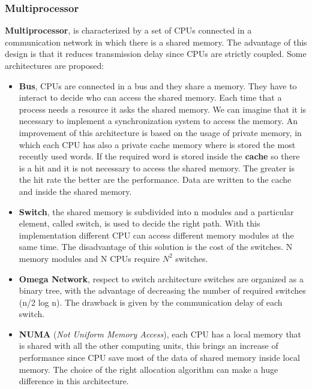 \documentclass[11pt,a4paper]{article}
\begin{document}
\subsubsection{Multiprocessor}
\textbf{Multiprocessor}, is characterized by a set of CPUs connected in a communication network in which there is a shared memory. The advantage of this design is that it reduces transmission delay since CPUs are strictly coupled. Some architectures are proposed:
\begin{itemize}
    \item \textbf{Bus}, CPUs are connected in a bus and they share a memory. They have to interact to decide who can access the shared memory. Each time that a process needs a resource it asks the shared memory. We can imagine that it is necessary to implement a synchronization system to access the memory.
     An improvement of this architecture is based on the usage of private memory, in which each CPU has also a private cache memory where is stored the most recently used words. If the required word is stored inside the \textbf{cache} so there is a hit and it is not necessary to access the shared memory. The greater is the hit rate the better are the performance. Data are written to the cache and inside the shared memory.
    \item \textbf{Switch}, the shared memory is subdivided into n modules and a particular element, called switch, is used to decide the right path. With this implementation different CPU can access different memory modules at the same time. The disadvantage of this solution is the cost of the switches. N memory modules and N CPUs require $N^2$ switches.
    \item \textbf{Omega Network}, respect to switch architecture switches are organized as a binary tree, with the advantage of decreasing the number of required switches (n/2 log n). The drawback is given by the communication delay of each switch.
    \item \textbf{NUMA} (\textit{Not Uniform Memory Access}), each CPU has a local memory that is shared with all the other computing units, this brings an increase of performance since CPU save most of the data of shared memory inside local memory. The choice of the right allocation algorithm can make a huge difference in this architecture. 
\end{itemize}
\end{document}
